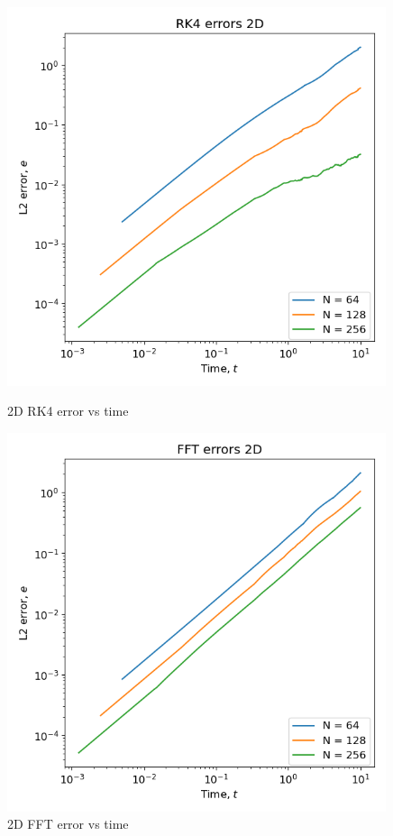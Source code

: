 \documentclass[12pt]{article}
\begin{document}
\begin{figure}
\begin{minipage}{0.3\textwidth}
        \includegraphics[width=0.99\textwidth]{../figures/RK4_errors_2D.png}
        \caption{2D RK4 error vs time}
        \label{fig:2d_rk4_err}
    \end{minipage}\hfill
    \begin{minipage}{0.3\textwidth}
        \centering
        \includegraphics[width=0.99\textwidth]{../figures/FFT_errors_2D.png}
        \caption{2D FFT error vs time}
        \label{fig:2d_fft_err}
    \end{minipage}\hfill
\end{figure}
\end{document}
